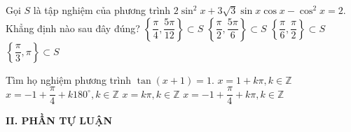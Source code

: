 \begin{ex}%
	Gọi $ S $ là tập nghiệm của phương trình $ 2\sin^2 x+3\sqrt{3}\sin x\cos x-\cos^2 x=2 $. Khẳng định nào sau đây đúng?
	\choice
	{$\left\{\dfrac{\pi}{4},\dfrac{5\pi}{12} \right\} \subset S$}
	{$\left\{\dfrac{\pi}{2},\dfrac{5\pi}{6} \right\} \subset S$}
	{\True $\left \{\dfrac{\pi}{6},\dfrac{\pi}{2} \right\} \subset S$}
	{$\left\{\dfrac{\pi}{3}, \pi\right\}\subset S$}
\end{ex}
\begin{ex}%
	Tìm họ nghiệm phương trình $ \tan(x+1)=1 $.
	\choice
	{$x=1+k\pi, k\in \mathbb{Z} $}
	{$x=-1+\dfrac{\pi}{4}+k 180^{\circ}, k \in \mathbb{Z} $}
	{$x=k\pi, k\in \mathbb{Z}  $}
	{\True $x=-1+\dfrac{\pi}{4}+k\pi, k\in \mathbb{Z} $}
\end{ex}
\noindent\textbf{II. PHẦN TỰ LUẬN}

